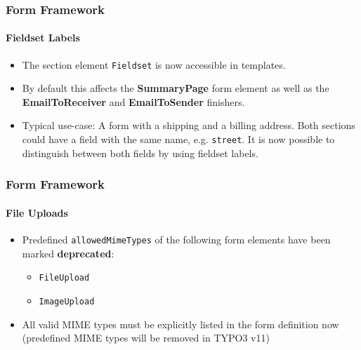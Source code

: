 
\begin{frame}[fragile]
	\frametitle{Form Framework}
	\framesubtitle{Fieldset Labels}

	\begin{itemize}
		\item The section element \texttt{Fieldset} is now accessible in templates.
		\item By default this affects the \textbf{SummaryPage} form element as well as the \textbf{EmailToReceiver} and \textbf{EmailToSender} finishers.
		\item Typical use-case:\newline
			\small
				A form with a shipping and a billing address. Both sections could have a field with the same name, e.g. \texttt{street}.
				It is now possible to distinguish between both fields by using fieldset labels.
			\normalsize

	\end{itemize}

\end{frame}


\begin{frame}[fragile]
	\frametitle{Form Framework}
	\framesubtitle{File Uploads}

	\begin{itemize}
		\item Predefined \texttt{allowedMimeTypes} of the following form elements have been marked \textbf{deprecated}:

			\begin{itemize}
				\item \texttt{FileUpload}
				\item \texttt{ImageUpload}
			\end{itemize}

		\item All valid MIME types must be explicitly listed in the form definition now\newline
			\smaller
				(predefined MIME types will be removed in TYPO3 v11)
			\normalsize

	\end{itemize}

\end{frame}

